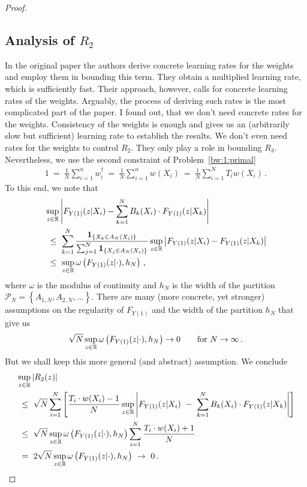 \begin{proof}
\subsection*{Analysis of $R_2$}
In the original paper \cite{Wang2019} the authors derive concrete learning rates for the weights and employ them in bounding this term. They obtain a multiplied learning rate, which is sufficiently fast. Their approach, however, calls for concrete learning rates of the weights. Arguably, the process of deriving such rates is the most complicated part of the paper. 
I found out, that we don't need concrete rates for the weights. 
Consistency of the weights is enough and gives us an (arbitrarily slow but sufficient) learning rate to establish the results.
We don't even need rates for the weights to control $R_2$.
They only play a role in bounding $R_3$.
Nevertheless, we use the 
second constraint of Problem~\eqref{bw:1:primal} 
\begin{gather}
  1
  \ 
  =
  \ 
\frac{1}{N}\sum_{i=1}^{n}w_i^\dagger
  \ 
  =
  \ 
\frac{1}{N}\sum_{i=1}^{n}w(X_i)
  \ 
=
  \ 
\frac{1}{N}\sum_{i=1}^{N}T_iw(X_i)
\,.
\end{gather}
To this end, we note that
\begin{align*}
&
  \sup_{z\in\R}
  \left| 
  F_{Y(1)}(z|X_i)
  -
  \sum_{k=1}^{N} 
  B_k(X_i)
  \cdot
  F_{Y(1)}(z|X_k)
  \right|
  \\
  &
  \ 
  \le
  \ 
  \sum_{k=1}^{N} 
  \frac{\mathbf{1}_{\left\{ X_k\in A_N(X_i) \right\}}}
  {
    \sum_{j=1}^{N} 
\mathbf{1}_{\left\{ X_j\in A_N(X_i) \right\}}
  }
  \sup_{z\in\R}
  \left| 
  F_{Y(1)}(z|X_i)
  -
  F_{Y(1)}(z|X_k)
  \right|
  \\
  &
  \ 
  \le
  \ 
  \sup_{z\in\R}
  \omega
  \left( 
    F_{Y(1)}(z|\cdot)
    ,h_N
  \right)
  \,,
\end{align*}
where $\omega$ is the modulus of continuity and $h_N$ is the width of
the partition $\mathcal{P}_N=\left\{A_{1,N},A_{2,N},\ldots  \right\}$.
There are many (more concrete, yet stronger) assumptions on the regularity of
$F_{Y(1)}$ and the width of the partition $h_N$ that give us
\begin{gather}
  \sqrt{N}
  \sup_{z\in\R}
  \omega
  \left( 
    F_{Y(1)}(z|\cdot)
    ,h_N
  \right)
  \to
  0
  \qquad
  \text{for}\ 
  N\to \infty
  \,.
\end{gather}
But we shall keep this more general (and abstract) assumption.
We conclude
\begin{align*}
&
  \sup_{z\in\R}
  \left| 
  R_2(z)
  \right|
  \\
  &
  \ 
  \le
  \ 
  \sqrt{N}
    \sum_{i=1}^{N} 
    \left[ 
  \frac{
    T_i\cdot w(X_i) -1 }{N}
  \sup_{z\in\R}
    \left| 
  F_{Y(1)}(z|X_i)
    \ 
    -
    \ 
    \sum_{k=1}^{N} 
    B_k(X_i)
    \cdot
  F_{Y(1)}(z|X_k)
    \right|
    \right]
    \\
    &
  \ 
    \le
  \ 
    \sqrt{N}
  \sup_{z\in\R}
  \omega
  \left( 
    F_{Y(1)}(z|\cdot)
    ,h_N
  \right)
  \sum_{i=1}^{N} 
  \frac{
    T_i\cdot w(X_i) +1 }{N}
    \\
    &
  \ 
    =
  \ 
    2
    \sqrt{N}
  \sup_{z\in\R}
  \omega
  \left( 
    F_{Y(1)}(z|\cdot)
    ,h_N
  \right)
  \ 
  \to 
  \ 
  0\,.
\end{align*}

\end{proof}
